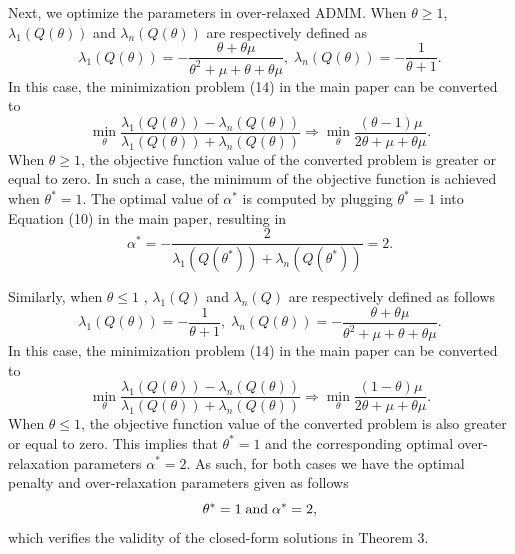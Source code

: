 \documentclass[letterpaper]{article} %
\begin{document}
Next, we optimize the parameters in over-relaxed ADMM. When $\theta\geq 1$, $\lambda_1(Q(\theta))$ and $\lambda_n(Q(\theta))$ are respectively defined as
\begin{equation*}
	\lambda_1(Q(\theta)) =- \frac{\theta +\theta\mu  }{\theta^2+\mu +\theta +\theta\mu },\; \lambda_n(Q(\theta))=-\frac{1}{\theta+1}.
\end{equation*}
In this case, the minimization problem (14) in the main paper can be converted to
\begin{equation*}
	\min_{\theta} \frac{\lambda_1 (Q\left(\theta\right))-\lambda_n (Q\left(\theta\right))}{\lambda_1\left(Q\left(\theta\right)\right)+\lambda_n\left(Q\left(\theta\right)\right)} \Rightarrow  \min_{\theta} \frac{(\theta -1)\mu}{2\theta+\mu+\theta\mu}.
\end{equation*}
When $\theta\geq 1$, the objective function value of the converted problem is greater or equal to zero. In such a case, the minimum of the objective function is achieved when $\theta^* = 1$. The optimal value of $\alpha^*$ is computed by plugging $\theta^* = 1$ into Equation (10) in the main paper, resulting in 
\begin{equation*}
	\alpha^* = -\frac{2}{\lambda_1\left(Q\left(\theta^*\right)\right)+\lambda_n\left(Q\left(\theta^*\right)\right)}=2.
\end{equation*}

Similarly, when $\theta\leq1$ , $\lambda_1(Q)$ and $\lambda_n(Q)$ are respectively defined as follows
\begin{equation*}
	\lambda_1(Q(\theta)) =-\frac{1}{\theta+1},\; \lambda_n(Q(\theta))=- \frac{\theta +\theta\mu  }{\theta^2+\mu +\theta +\theta\mu }.
\end{equation*}
In this case, the minimization problem (14) in the main paper can be converted to
\begin{equation*}
	\min_{\theta} \frac{\lambda_1 (Q\left(\theta\right))-\lambda_n (Q\left(\theta\right))}{\lambda_1\left(Q\left(\theta\right)\right)+\lambda_n\left(Q\left(\theta\right)\right)} \Rightarrow \min_{\theta} \frac{(1-\theta )\mu}{2\theta+\mu+\theta\mu}.
\end{equation*}
When $\theta \leq 1$, the objective function value of the converted problem is also greater or equal to zero. This implies that  $\theta^*= 1$ and the corresponding optimal over-relaxation parameters $\alpha^*=2$. As such, for both cases we have the optimal penalty and over-relaxation parameters given as follows
\begin{equation*}
	\theta^*=1 \; \rm{and} \; \alpha^*=2,
\end{equation*}
which verifies the validity of the closed-form solutions in Theorem 3.
\end{document}

